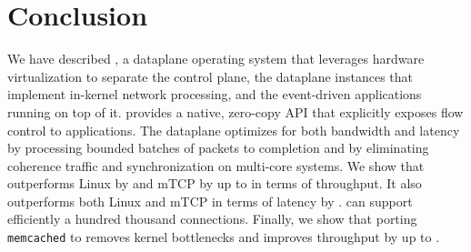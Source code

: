 
\section{Conclusion}

We have described \ix, a dataplane operating system that leverages
hardware virtualization to separate the control plane, the \ix
dataplane instances that implement in-kernel network processing, and
the event-driven applications running on top of it.  \ix provides a
native, zero-copy API that explicitly exposes flow control to
applications. The \ix dataplane optimizes for both bandwidth and
latency by processing bounded batches of packets to completion and by
eliminating coherence traffic and synchronization on multi-core
systems. We show that \ix outperforms Linux  by  and mTCP by up
to  in terms of throughput. It also outperforms both Linux and mTCP in
terms of latency by . \ix can support
efficiently a hundred thousand connections. Finally, we show that
porting \texttt{memcached} to \ix removes kernel bottlenecks and
improves throughput by up to .


